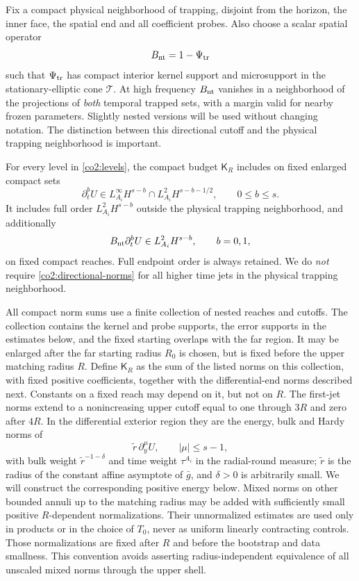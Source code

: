Fix a compact physical neighborhood of trapping, disjoint from the horizon,
the inner face, the spatial end and all coefficient probes.  Also choose a
scalar spatial operator
\begin{equation}\label{co2:directional-cutoff}
 B_{\rm nt}=1-\Psi_{\rm tr}
\end{equation}
such that $\Psi_{\rm tr}$ has compact interior kernel support and microsupport
in the stationary-elliptic cone $\mathcal T$.  At high frequency $B_{\rm nt}$
vanishes in a neighborhood of the projections of \emph{both} temporal trapped
sets, with a margin valid for nearby frozen parameters.  Slightly nested
versions will be used without changing notation.  The distinction between
this directional cutoff and the physical trapping neighborhood is important.

For every level in \eqref{co2:levels}, the compact budget $\mathsf K_R$ includes
on fixed enlarged compact sets
\begin{equation}\label{co2:compact-norms}
 \partial_t^bU\in
 L^\infty_{A_i}H^{s-b}\cap L^2_{A_i}H^{s-b-1/2},
 \qquad 0\le b\le s.
\end{equation}
It includes full order $L^2_{A_i}H^{s-b}$ outside the physical trapping
neighborhood, and additionally
\begin{equation}\label{co2:directional-norms}
 B_{\rm nt}\partial_t^bU\in L^2_{A_i}H^{s-b},
 \qquad b=0,1,
\end{equation}
on fixed compact reaches.  Full endpoint order is always retained.  We do
\emph{not} require \eqref{co2:directional-norms} for all higher time jets in the
physical trapping neighborhood.

All compact norm sums use a finite collection of nested reaches and cutoffs.
The collection contains the kernel and probe supports, the error supports in
the estimates below, and the fixed starting overlaps with the far region.
It may be enlarged after the far starting radius $R_0$ is chosen, but is fixed
before the upper matching radius $R$.  Define $\mathsf K_R$ as the sum of the
listed norms on this collection, with fixed positive coefficients, together
with the differential-end norms described next.  Constants on a fixed reach
may depend on it, but not on $R$.  The first-jet norms extend to a
nonincreasing upper cutoff equal to one through $3R$ and zero
after $4R$.  In the differential exterior region they are the energy, bulk and
Hardy norms of
\[
 \widetilde r\,\partial_y^\mu U,\qquad |\mu|\le s-1,
\]
with bulk weight $\widetilde r^{-1-\delta}$ and time weight $\tau^{A_i}$ in
the radial-round measure; $\widetilde r$ is the radius of the constant affine
asymptote of $\bar g$, and $\delta>0$ is arbitrarily small.  We will construct
the corresponding positive energy below.  Mixed norms on other bounded annuli
up to the matching radius may be added with sufficiently small positive
$R$-dependent normalizations.  Their unnormalized estimates are used only in
products or in the choice of $T_0$, never as uniform linearly contracting
controls.  Those normalizations are fixed after $R$ and before the bootstrap
and data smallness.  This convention avoids asserting radius-independent
equivalence of all unscaled mixed norms through the upper shell.

